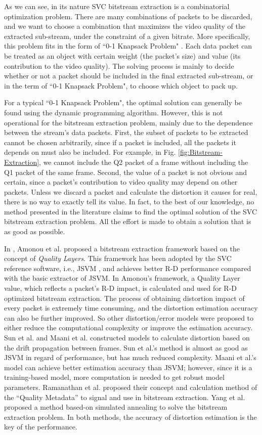 \documentclass[journal]{IEEEtran}
\begin{document}
As we can see, in its nature SVC bitstream extraction is a combinatorial optimization problem. There are many combinations of packets to be discarded, and we want to choose a combination that maximizes the video quality of the extracted sub-stream, under the constraint of a given bitrate. More specifically, this problem fits in the form of ``0-1 Knapsack Problem" \cite{Knapsack}. Each data packet can be treated as an object with certain weight (the packet's size) and value (its contribution to the video quality). The solving process is mainly to decide whether or not a packet should be included in the final extracted sub-stream, or in the term of ``0-1 Knapsack Problem", to choose which object to pack up.

For a typical ``0-1 Knapsack Problem", the optimal solution can generally be found using the dynamic programming algorithm. However, this is not operational for the bitstream extraction problem, mainly due to the dependence between the stream's data packets. First, the subset of packets to be extracted cannot be chosen arbitrarily, since if a packet is included, all the packets it depends on must also be included. For example, in Fig. \ref{fig:Bitstream-Extraction}, we cannot include the Q2 packet of a frame without including the Q1 packet of the same frame. Second, the value of a packet is not obvious and certain, since a packet's contribution to video quality may depend on other packets. Unless we discard a packet and calculate the distortion it causes for real, there is no way to exactly tell its value. In fact, to the best of our knowledge, no method presented in the literature claims to find the optimal solution of the SVC bitstream extraction problem. All the effort is made to obtain a solution that is as good as possible.

In \cite{Amonou07}, Amonou et al. proposed a bitstream extraction framework based on the concept of \textit{Quality Layers}. This framework has been adopted by the SVC reference software, i.e., JSVM  \cite{JSVM}, and achieves better R-D performance compared with the basic extractor of JSVM. In Amonou's framework, a Quality Layer value, which reflects a packet's R-D impact, is calculated and used for R-D optimized bitstream extraction. The process of obtaining distortion impact of every packet is extremely time consuming, and the distortion estimation accuracy can also be further improved. So other distortion/error models were proposed to either reduce the computational complexity or improve the estimation accuracy. Sun et al. \cite{Sun09} and Maani et al. \cite{Maani09} constructed models to calculate distortion based on the drift propagation between frames. Sun et al.'s method is almost as good as JSVM in regard of performance, but has much reduced complexity. Maani et al.'s model can achieve better estimation accuracy than JSVM; however, since it is a training-based model, more computation is needed to get robust model parameters. Ramanathan et al. \cite{Ramanathan12} proposed their concept and calculation method of the ``Quality Metadata'' to signal and use in bitstream extraction. Yang et al. \cite{Yang13} proposed a method based-on simulated annealing to solve the bitstream extraction problem. In both methods, the accuracy of distortion estimation is the key of the performance.
\end{document}
